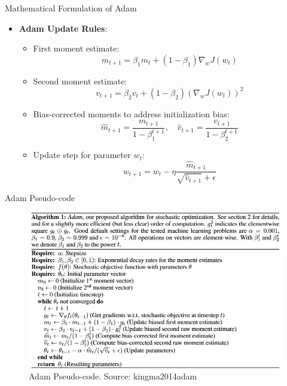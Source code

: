 \documentclass[serif, aspectratio=169]{beamer}
\begin{document}
\begin{frame}{Mathematical Formulation of Adam}
    \begin{itemize}
        \item \textbf{Adam Update Rules}:
        \begin{itemize}
            \item First moment estimate:
            \[
            m_{t+1} = \beta_1 m_t + (1 - \beta_1) \nabla_w J(w_t)
            \]
            \item Second moment estimate:
            \[
            v_{t+1} = \beta_2 v_t + (1 - \beta_2) (\nabla_w J(w_t))^2
            \]
            \item Bias-corrected moments to address initialization bias:
            \[
            \hat{m}_{t+1} = \frac{m_{t+1}}{1 - \beta_1^{t+1}}, \quad 
            \hat{v}_{t+1} = \frac{v_{t+1}}{1 - \beta_2^{t+1}}
            \]
            \item Update step for parameter \( w_t \):
            \[
            w_{t+1} = w_t - \eta \frac{\hat{m}_{t+1}}{\sqrt{\hat{v}_{t+1}} + \epsilon}
            \]
        \end{itemize}
    \end{itemize}
\end{frame}

\begin{frame}{Adam Pseudo-code}
    \begin{figure}
        \centering
        \includegraphics[width=0.7\linewidth]{pic/adam_pseudocode.jpg}
        \caption{\footnotesize Adam Pseudo-code. Source: kingma2014adam}

    \end{figure}
\end{frame}
\end{document}
